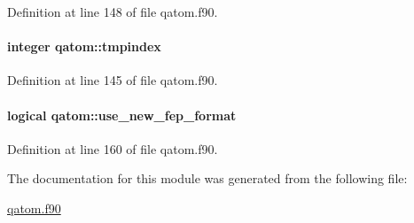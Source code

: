 Definition at line 148 of file qatom.\-f90.

\hypertarget{classqatom_ac84c7edf661c77c14c60cdcb6ee92973}{
\paragraph[{tmpindex}]{\setlength{\rightskip}{0pt plus 5cm}integer qatom\-::tmpindex}}\label{classqatom_ac84c7edf661c77c14c60cdcb6ee92973}


Definition at line 145 of file qatom.\-f90.

\hypertarget{classqatom_ae60329e231213e5892113334daa1821e}{
\paragraph[{use\-\_\-new\-\_\-fep\-\_\-format}]{\setlength{\rightskip}{0pt plus 5cm}logical qatom\-::use\-\_\-new\-\_\-fep\-\_\-format}}\label{classqatom_ae60329e231213e5892113334daa1821e}


Definition at line 160 of file qatom.\-f90.



The documentation for this module was generated from the following file\-:\begin{DoxyCompactItemize}
\item 
\hyperlink{qatom_8f90}{qatom.\-f90}\end{DoxyCompactItemize}
